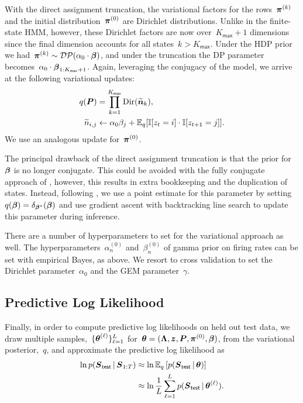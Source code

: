 With the direct assignment truncation, the variational factors for the
rows~$\boldsymbol{\pi}^{(k)}$ and the initial distribution~$\boldsymbol{\pi}^{(0)}$ are
Dirichlet distributions. Unlike in the finite-state HMM, however,
these Dirichlet factors are now over~${K_{\mathsf{max}}+1}$ dimensions since the final
dimension accounts for all states~${k>K_{\mathsf{max}}}$. Under the HDP prior we
had~${\boldsymbol{\pi}^{(k)} \sim \mathcal{DP}(\alpha_0 \cdot \boldsymbol{\beta})}$, and under the
truncation the DP parameter becomes~$\alpha_0 \cdot
\boldsymbol{\beta}_{1:K_{\mathsf{max}}+1}$.
Again, leveraging the conjugacy of the model, we arrive at the
following variational updates:
\begin{align*}
q(\boldsymbol{P}) &= \prod_{k=1}^{K_{\mathsf{max}}} \mathrm{Dir}(\widetilde{\boldsymbol{n}}_k), \\
\widetilde{n}_{i,j} &\leftarrow \alpha_0 \beta_j + \mathbb{E}_q[\mathbb{I}[z_t=i]\cdot\mathbb{I}[z_{t+1}=j]].
\end{align*}
We use an analogous update for~$\boldsymbol{\pi}^{(0)}$.

The principal drawback of the direct assignment truncation is that the
prior for~$\boldsymbol{\beta}$ is no longer conjugate. This could be avoided with
the fully conjugate approach of \citep{Hoffman13}, however, this
results in extra bookkeeping and the duplication of states. Instead,
following \citep{Johnson14, Bryant12, Liang07}, we use a point
estimate for this parameter by setting~${q(\boldsymbol{\beta})=\delta_{\boldsymbol{\beta}^*}}(\boldsymbol{\beta})$
and use gradient ascent with backtracking line search to update this
parameter during inference.

There are a number of hyperparameters to set for the variational
approach as well. The hyperparameters~$\alpha_n^{(0)}$ and~$\beta_n^{(0)}$ of
gamma prior on firing rates can be set with empirical Bayes, as
above. We resort to cross validation to set the Dirichlet
parameter~$\alpha_0$ and the GEM parameter~$\gamma$.
 

\subsection{Predictive Log Likelihood}
Finally, in order to compute predictive log likelihoods on held out
test data, we draw multiple samples,~$\{\boldsymbol{\theta}^{(\ell)}\}_{\ell=1}^L$
for~$\boldsymbol{\theta}=(\boldsymbol{\Lambda}, \boldsymbol{z}, \boldsymbol{P}, \boldsymbol{\pi}^{(0)}, \boldsymbol{\beta})$, from the
variational posterior,~$q$, and approximate the predictive log likelihood as
\begin{align*}
  \ln p(\boldsymbol{S}_{\mathsf{test}} \,|\, \boldsymbol{S}_{1:T}) 
  &\approx \ln \mathbb{E}_q\left[p(\boldsymbol{S}_{\mathsf{test}} \,|\, \boldsymbol{\theta})\right] \\
  &\approx \ln \frac{1}{L} \sum_{\ell=1}^L p(\boldsymbol{S}_{\mathsf{test}} \,|\, \boldsymbol{\theta}^{(\ell)}).
\end{align*}

